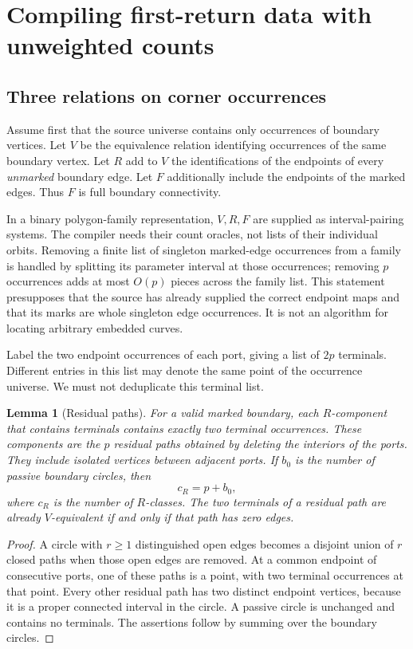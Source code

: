 \documentclass[11pt]{article}
\newtheorem{lemma}[theorem]{Lemma}
\theoremstyle{definition}
\theoremstyle{remark}\newtheorem{remark}[theorem]{Remark}
\begin{document}
\section{Compiling first-return data with unweighted counts}
\label{sec:compiler}

\subsection{Three relations on corner occurrences}
Assume first that the source universe contains only occurrences of boundary vertices. Let $V$ be the equivalence relation identifying occurrences of the same boundary vertex. Let $R$ add to $V$ the identifications of the endpoints of every \emph{unmarked} boundary edge. Let $F$ additionally include the endpoints of the marked edges. Thus $F$ is full boundary connectivity.

In a binary polygon-family representation, $V,R,F$ are supplied as interval-pairing systems. The compiler needs their count oracles, not lists of their individual orbits. Removing a finite list of singleton marked-edge occurrences from a family is handled by splitting its parameter interval at those occurrences; removing $p$ occurrences adds at most $O(p)$ pieces across the family list. This statement presupposes that the source has already supplied the correct endpoint maps and that its marks are whole singleton edge occurrences. It is not an algorithm for locating arbitrary embedded curves.

Label the two endpoint occurrences of each port, giving a list of $2p$ terminals. Different entries in this list may denote the same point of the occurrence universe. We must not deduplicate this terminal list.

\begin{lemma}[Residual paths]\label{lem:paths}
For a valid marked boundary, each $R$-component that contains terminals contains exactly two terminal occurrences. These components are the $p$ residual paths obtained by deleting the interiors of the ports. They include isolated vertices between adjacent ports. If $b_0$ is the number of passive boundary circles, then
\begin{equation}\label{eq:residual}
             c_R=p+b_0,
\end{equation}
where $c_R$ is the number of $R$-classes. The two terminals of a residual path are already $V$-equivalent if and only if that path has zero edges.
\end{lemma}
\begin{proof}
A circle with $r\ge1$ distinguished open edges becomes a disjoint union of $r$ closed paths when those open edges are removed. At a common endpoint of consecutive ports, one of these paths is a point, with two terminal occurrences at that point. Every other residual path has two distinct endpoint vertices, because it is a proper connected interval in the circle. A passive circle is unchanged and contains no terminals. The assertions follow by summing over the boundary circles.
\end{proof}
\end{document}
